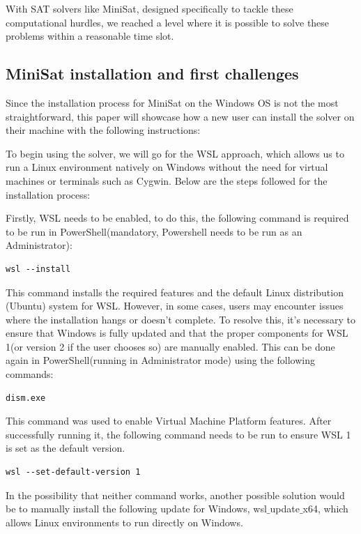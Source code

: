\documentclass[runningheads]{llncs}
\begin{document}
With \ac{SAT} solvers like MiniSat, designed specifically to tackle these computational hurdles, we reached a level where it is possible to solve these problems within a reasonable time slot.

\subsection{MiniSat installation and first challenges}\label{cap:MiniSat installation and first challenges}

Since the installation process for MiniSat on the Windows \ac{OS} is not the most straightforward, this paper will showcase how a new user can install the solver on their machine with the following instructions:

To begin using the solver, we will go for the \ac{WSL} approach, which allows us to run a Linux environment natively on Windows without the need for virtual machines or terminals such as Cygwin. Below are the steps followed for the installation process:

Firstly, \ac{WSL} needs to be enabled, to do this, the following command is required to be run in PowerShell(mandatory, Powershell needs to be run as an Administrator):
\begin{verbatim}wsl --install\end{verbatim}

This command installs the required features and the default Linux distribution (Ubuntu) system for \ac{WSL}. However, in some cases, users may encounter issues where the installation hangs or doesn't complete. To resolve this, it's necessary to ensure that Windows is fully updated and that the proper components for \ac{WSL} 1(or version 2 if the user chooses so) are manually enabled. This can be done again in PowerShell(running in Administrator mode) using the following commands: 
\begin{verbatim}dism.exe\end{verbatim} 
This command was used to enable Virtual Machine Platform features. After successfully running it, the following command needs to be run to ensure \ac{WSL} 1 is set as the default version.
\begin{verbatim}wsl --set-default-version 1 \end{verbatim}  

In the possibility that neither command works, another possible solution would be to manually install the following update for Windows, wsl$\_$update$\_$x64, which allows Linux environments to run directly on Windows.
\end{document}

